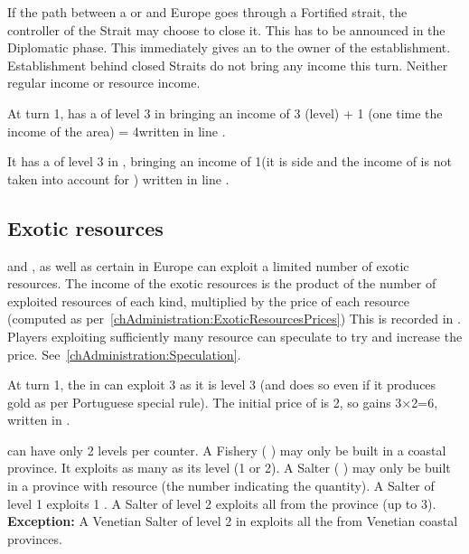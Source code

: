 \aparag[] [BLP] If the path between a \COL or \TP and Europe goes
through a Fortified strait, the controller of the Strait may choose to
close it.
\bparag This has to be announced in the Diplomatic phase. This
immediately gives an \OCB to the owner of the establishment.
\bparag Establishment behind closed Straits do not bring any income
this turn. Neither regular income or resource income.

\begin{exemple}
  At turn 1, \POR has a \COL of level 3 in 
  bringing an income of 3 (level) + 1 (one time the income of the
   area) = 4\ducats written in line
  .

  It has a \TP of level 3 in , bringing an income
  of 1\ducats (it is side \Facemoins and the income of
  \granderegionCotedor is not taken into account for \TP) written in
  line .
\end{exemple}

\subsection{Exotic resources}
\label{chIncomes:Exotic ressources}
\aparag \COL and \TP, as well as certain \MNU in Europe can exploit a
limited number of exotic resources.
\bparag The income of the exotic resources is the product of the number
of exploited resources of each kind, multiplied by the price of each
resource (computed as per~\ref{chAdministration:ExoticResourcesPrices})
\bparag This is recorded in .
\bparag Players exploiting sufficiently many resource can speculate to
try and increase the price. See~\ref{chAdministration:Speculation}.

\begin{exemple}
  At turn 1, the \TP in  can exploit 3 
  as it is level 3 (and does so even if it produces gold as per
  Portuguese special rule). The initial price of  is
  2\ducats, so \POR gains 3$\times$2=6\ducats, written in
  .
\end{exemple}

\aparag[Manufactures] \MNU can have only 2 levels per counter.
\bparag A Fishery ( \MNU) may only be built in a coastal
province. It exploits as many  as its level (1 or 2).
\bparag A Salter ( \MNU) may only be built in a province with
 resource (the number indicating the quantity).
\bparag A Salter of level 1 exploits 1 .
\bparag A Salter of level 2 exploits all  from the province (up to
3).
\bparag \textbf{Exception:} A Venetian Salter of level 2 in \provinceVeneto
exploits all the  from Venetian coastal provinces.

